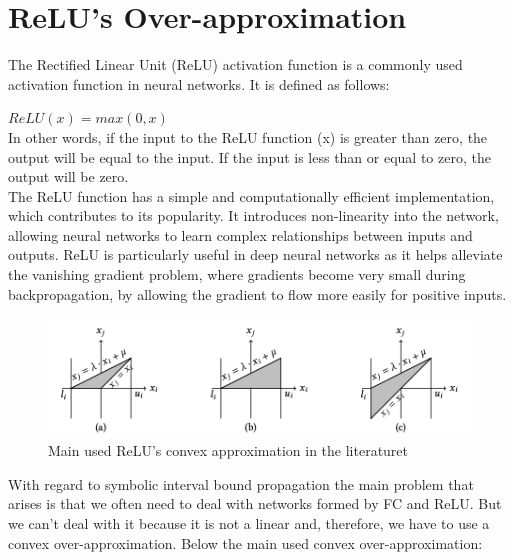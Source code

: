 \section{ReLU's Over-approximation}

The Rectified Linear Unit (ReLU) activation function is a commonly used activation function in neural networks. It is defined as follows:

\vspace{5mm}
$ReLU(x) = max(0, x)$
\vspace{5mm}
\\
In other words, if the input to the ReLU function (x) is greater than zero, the output will be equal to the input. If the input is less than or equal to zero, the output will be zero.
\\
The ReLU function has a simple and computationally efficient implementation, which contributes to its popularity. It introduces non-linearity into the network, allowing neural networks to learn complex relationships between inputs and outputs. ReLU is particularly useful in deep neural networks as it helps alleviate the vanishing gradient problem, where gradients become very small during backpropagation, by allowing the gradient to flow more easily for positive inputs.

\begin{figure}[t]
	\caption{\label{fig:relu_types} Main used ReLU's convex approximation in the literaturet}
	\centering
	\includegraphics[scale=0.8]{"Chapter5/img/ReLU's/relus.png"}
\end{figure}


With regard to symbolic interval bound propagation the main problem that arises is that we often need to deal with networks formed by FC and ReLU. But we can't deal with it because it is not a linear and, therefore, we have to use a convex over-approximation. Below the main used convex over-approximation:

